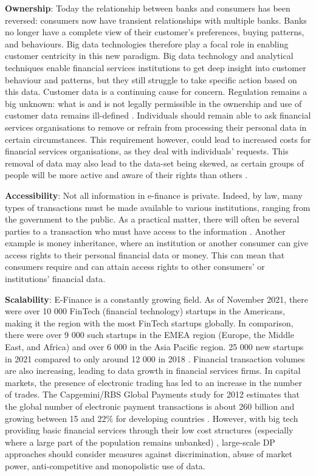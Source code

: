 \textbf{Ownership}: Today the relationship between banks and consumers has been reversed: consumers now have transient relationships with multiple banks. Banks no longer have a complete view of their customer’s preferences, buying patterns, and behaviours. Big data technologies therefore play a focal role in enabling customer centricity in this new paradigm. Big data technology and analytical techniques enable financial services institutions to get deep insight into customer behaviour and patterns, but they still struggle to take specific action based on this data. Customer data is a continuing cause for concern. Regulation remains a big unknown: what is and is not legally permissible in the ownership and use of customer data remains ill-defined \cite{cavanillas2016new}. Individuals should remain able to ask financial services organisations to remove or refrain from processing their personal data in certain circumstances.
This requirement however, could lead to increased costs for financial services organisations, as they deal with individuals’ requests. This removal of data may also lead to the data-set being skewed, as certain groups of people will be more active and aware of their rights than others \cite{cavanillas2016new}.\newline

\textbf{Accessibility}: Not all information in e-finance is private. Indeed, by law, many types of transactions must be made available to various institutions, ranging from the government to the public. As a practical matter, there will often be several parties to a transaction who must have access to the information \cite{trust_traceab_e_commerce}. Another example is money inheritance, where an institution or another consumer can give access rights to their personal financial data or money. This can mean that consumers require and can attain access rights to other consumers' or institutions' financial data. \newline

\textbf{Scalability}: E-Finance is a constantly growing field. As of November 2021, there were over 10 000 FinTech (financial technology) startups in the Americans, making it the region with the most FinTech startups globally. In comparison, there were over 9 000 such startups in the EMEA region (Europe, the Middle East, and Africa) and over 6 000 in the Asia Pacific region. 25 000 new startups in 2021 compared to only around 12 000 in 2018 \cite{fin_scale}.
Financial transaction volumes are also increasing, leading to data growth in financial services firms. In capital markets, the presence of electronic trading has led to an increase in the number of trades. The Capgemini/RBS Global Payments study for 2012 estimates that the global number of electronic payment transactions is about 260 billion and growing between 15 and 22\% for developing countries \cite{cavanillas2016new}.
However, with big tech providing basic financial services through their low cost structures (especially where a large part of the population remains unbanked) \cite{big_tech_in_finance}, large-scale DP approaches should consider measures against discrimination, abuse of market power, anti-competitive and monopolistic use of data. \newline

